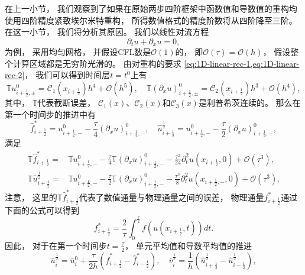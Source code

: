 在上一小节，
我们观察到了如果在原始两步四阶框架中函数值和导数值的重构均使用四阶精度紧致埃尔米特重构，
所得数值格式的精度阶数将从四阶降至三阶。
在这一小节，
我们将分析其原因。
我们以线性对流方程
\begin{equation}
  {\partial_{t}} u + {\partial_{x}} u = 0,
\end{equation}
为例，
采用均匀网格，
并假设CFL数是$\mathcal{O}(1)$的，
即$\mathcal{O}(\tau)=\mathcal{O}(h)$，
假设整个计算区域都是无穷阶光滑的。
由对重构的要求 \cref{eq:1D-linear-rec-1,eq:1D-linear-rec-2}，
我们可以得到时间层$t=t^0$上有
\begin{equation}
  \label{eq:origin-JD-1}
  {\mathbb{T}}u_{i+\frac12,\pm}^0 = \mathcal{C}_1(x_{i+\frac{1}{2}})h^4+{\mathcal{O}}(h^{5}), \quad
  {\mathbb{T}}\left({\partial_x}u\right)_{i+\frac12,\pm}^0 = \mathcal{C}_2(x_{i+\frac{1}{2}})h^3+{\mathcal{O}}(h^{4}),
\end{equation}
其中，
${\mathbb{T}}$代表截断误差，
$\mathcal{C}_1(x)$、$\mathcal{C}_2(x)$和$\mathcal{C}_3(x)$是利普希茨连续的。
那么在第一个时间步的推进中有
\begin{equation}
  \label{eq:origin-JD-2}
  \hat{f}^*_{i+\frac 12} = u_{i+\frac{1}{2},-}^{0} - \frac\tau4\left({\partial_x}u\right)_{i+\frac{1}{2},-}^{0},\quad
  \hat{u}^{\frac12}_{i+\frac12} = u_{i+\frac{1}{2},-}^{0} - \frac\tau2\left({\partial_x}u\right)_{i+\frac{1}{2},-}^{0},
\end{equation}
满足
\begin{align}
  \label{eq:origin-JD-3}
  {\mathbb{T}}\hat{f}^*_{i+\frac 12} =
   & {\mathbb{T}} u_{i+\frac{1}{2},-}^{0}-\frac\tau4 {\mathbb{T}} \left({\partial_{x}} u\right)_{i+\frac 12,-}^{0} - \frac{\tau^2}{24} {\partial_{t}^2} u(x_{i+\frac 12},0)+{\mathcal{O}}(\tau^3), \\
  \label{eq:origin-JD-3-2}
  {\mathbb{T}}\hat {u}^{\frac 12}_{i+\frac 12} =
   & {\mathbb{T}} u_{i+\frac{1}{2},-}^{0}-\frac\tau2 {\mathbb{T}} \left({\partial_{x}} u\right)_{i+\frac 12,-}^{0}-\frac{\tau^2}{8}{\partial_{t}^2} u(x_{i+\frac 12,-}, 0)+{\mathcal{O}}(\tau^3).
\end{align}
注意，
这里的${\mathbb{T}}\hat{f}^*_{i+\frac 12}$代表了数值通量与物理通量之间的误差，
物理通量$f_{i+\frac 12}^*$通过下面的公式可以得到
\begin{equation}
  f_{i+\frac 12}^* = \frac{2}{\tau}\int_{0}^{\frac\tau2} f(u(x_{i+\frac 12},t)) dt.
\end{equation}
因此，
对于在第一个时间步$t=\frac \tau 2$，
单元平均值和导数平均值的推进
\begin{equation}
  \label{eq:origin-JD-4}
  \bar u_{i}^{\frac 12} = \bar u_{i}^{0} + \frac{\tau}{2h} \left(\hat{f}^*_{i+\frac 12}-\hat{f}^*_{i-\frac 12}\right), \quad
  \bar v_{i}^{\frac 12} = \frac{1}{h} \left(\hat {u}^{\frac 12}_{i+\frac 12}-\hat {u}^{\frac 12}_{i-\frac 12}\right),
\end{equation}

